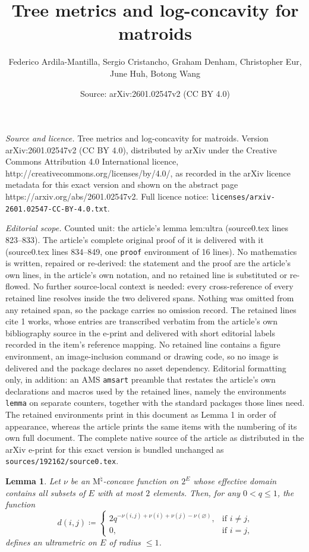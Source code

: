 \documentclass[10pt,a4paper]{amsart}
\title{Tree metrics and log-concavity for matroids}
\author{Federico Ardila-Mantilla, Sergio Cristancho, Graham Denham, Christopher Eur, June Huh, Botong Wang}
\date{Source: arXiv:2601.02547v2 (CC BY 4.0)}
\newtheorem{lemma}{Lemma}
\newcommand{\Mnat}{$\text{M}^\natural$}
\begin{document}
\maketitle

\noindent\emph{Source and licence.} Tree metrics and log-concavity for matroids. Version arXiv:2601.02547v2 (CC BY 4.0), distributed by arXiv under the Creative Commons Attribution 4.0 International licence, http://creativecommons.org/licenses/by/4.0/, as recorded in the arXiv licence metadata for this exact version and shown on the abstract page https://arxiv.org/abs/2601.02547v2. Full licence notice: \texttt{licenses/arxiv-2601.02547-CC-BY-4.0.txt}.\par\smallskip

\noindent\textit{Editorial scope.} Counted unit: the article's lemma lem:ultra (source0.tex lines 823--833). The article's complete original proof of it is delivered with it (source0.tex lines 834--849, one \texttt{proof} environment of 16 lines). No mathematics is written, repaired or re-derived: the statement and the proof are the article's own lines, in the article's own notation, and no retained line is substituted or re-flowed.  No further source-local context is needed: every cross-reference of every retained line resolves inside the two delivered spans.  Nothing was omitted from any retained span, so the package carries no omission record.  The retained lines cite 1 works, whose entries are transcribed verbatim from the article's own bibliography source in the e-print and delivered with short editorial labels recorded in the item's reference mapping.  No retained line contains a figure environment, an image-inclusion command or drawing code, so no image is delivered and the package declares no asset dependency.  Editorial formatting only, in addition: an AMS \texttt{amsart} preamble that restates the article's own declarations and macros used by the retained lines, namely the environments \texttt{lemma} on separate counters, together with the standard packages those lines need.  The retained environments print in this document as Lemma 1 in order of appearance, whereas the article prints the same items with the numbering of its own full document.  The complete native source of the article as distributed in the arXiv e-print for this exact version is bundled unchanged as \texttt{sources/192162/source0.tex}.
\begin{lemma}\label{lem:ultra}
Let $\nu$ be an \Mnat-concave function on $2^E$ whose effective domain contains all subsets of $E$ with at most $2$ elements. Then,  for any $0<q\leq 1$, the function
  \[
  d(i,j)\coloneqq 
  \begin{cases}
  2q^{-\nu(i,j)+\nu(i)+\nu(j)-\nu(\varnothing)}, & \text{if $i\neq j$,}\\
  0, & \text{if $i=j$,}
  \end{cases}
  \]
  defines an ultrametric on $E$ of radius $\le 1$. %
\end{lemma}
\end{document}
